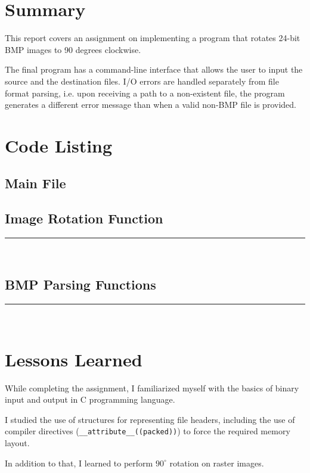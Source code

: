 \documentclass[en, listings]{labreport}
\begin{document}
\maketitlepage

\section*{Summary}

This report covers an assignment on implementing a program that rotates 24-bit
BMP images to 90 degrees clockwise.

The final program has a command-line interface that allows the user to input
the source and the destination files. I/O errors are handled separately from
file format parsing, i.e. upon receiving a path to a non-existent file, the
program generates a different error message than when a valid non-BMP file
is provided.

\section*{Code Listing}

\subsection*{Main File}



\subsection*{Image Rotation Function}



\noindent\rule{\textwidth}{1pt}\\



\subsection*{BMP Parsing Functions}



\noindent\rule{\textwidth}{1pt}\\



\section*{Lessons Learned}

While completing the assignment, I familiarized myself with the 
basics of binary input and output in C programming language.

I studied the use of structures for representing file headers, including the
use of compiler directives (\texttt{\_\_attribute\_\_((packed))}) to force the
required memory layout.

In addition to that, I learned to perform $90^\circ$ rotation on raster images.
\end{document}
